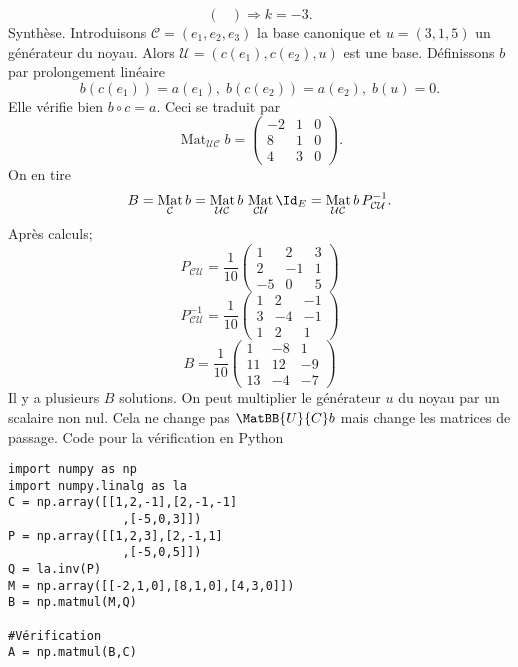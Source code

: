\begin{enumerate}
\begin{displaymath}
\begin{pmatrix}
\end{pmatrix}
\Rightarrow k=-3 .
\end{displaymath}
Synthèse.\newline
Introduisons $\mathcal{C}=(e_1,e_2,e_3)$ la base canonique et $u=(3,1,5)$ un générateur du noyau.\newline
Alors $\mathcal{U}=(c(e_1),c(e_2),u)$ est une base. Définissons $b$ par prolongement linéaire 
\begin{displaymath}
 b(c(e_1))=a(e_1),\; b(c(e_2))=a(e_2),\; b(u)=0.
\end{displaymath}
Elle vérifie bien $b\circ c = a$. Ceci se traduit par
\begin{displaymath}
 \mathop{\mathrm{Mat}}_{\mathcal U \mathcal C}b =
\begin{pmatrix}
 -2 & 1 & 0 \\ 8 & 1 & 0\\ 4 & 3 &0
\end{pmatrix}.
\end{displaymath}
On en tire
\begin{displaymath}
 B = \mathop{\mathrm{Mat}}_{\mathcal C}b
= \mathop{\mathrm{Mat}}_{\mathcal U \mathcal C}b\, \mathop{\mathrm{Mat}}_{\mathcal C \mathcal U }\Id_E
=  \mathop{\mathrm{Mat}}_{\mathcal U \mathcal C}b \, P_{\mathcal{C} \mathcal U }^{-1}.
\end{displaymath}
Après calculs;
\[
 P_{\mathcal{C} \mathcal U }
=\frac{1}{10}
\begin{pmatrix}
 1 & 2 & 3 \\ 2 & -1 & 1 \\ -5 & 0 & 5
\end{pmatrix}
\]
\begin{displaymath}
 P_{\mathcal{C} \mathcal U }^{-1}
=\frac{1}{10}
\begin{pmatrix}
 1 & 2 & -1 \\ 3 & -4 & -1 \\ 1 & 2 & 1
\end{pmatrix}
\end{displaymath}
\begin{displaymath}
B =\frac{1}{10}
\begin{pmatrix}
 1 & -8 & 1 \\ 11 & 12 & -9 \\ 13 & -4 & -7
\end{pmatrix}
\end{displaymath}
Il y a plusieurs $B$ solutions. On peut multiplier le générateur $u$ du noyau par un scalaire non nul. Cela ne change pas $\MatBB{U}{C}b$ mais change les matrices de passage.\newline
Code pour la vérification en Python
\begin{verbatim}
import numpy as np
import numpy.linalg as la
C = np.array([[1,2,-1],[2,-1,-1]
                ,[-5,0,3]])
P = np.array([[1,2,3],[2,-1,1]
                ,[-5,0,5]])
Q = la.inv(P)
M = np.array([[-2,1,0],[8,1,0],[4,3,0]])
B = np.matmul(M,Q)

#Vérification
A = np.matmul(B,C)
\end{verbatim} 
\end{enumerate}
 
